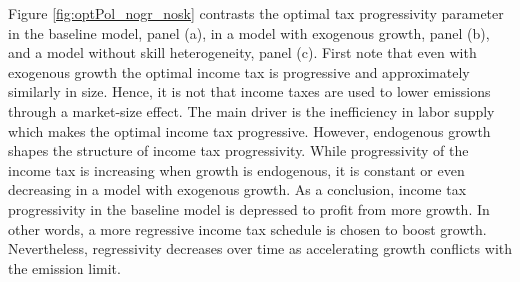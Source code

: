 Figure \ref{fig:optPol_nogr_nosk} contrasts the optimal tax progressivity parameter in the baseline model, panel (a), in a model with exogenous growth, panel (b), and a model without skill heterogeneity, panel (c).
First note that even with exogenous growth the optimal income tax is progressive and approximately similarly in size. Hence, it is not that income taxes are used to lower emissions through a market-size effect. The main driver is the inefficiency in labor supply which makes the optimal income tax progressive. However, endogenous growth shapes the structure of income tax progressivity. 
While progressivity of the income tax is increasing when growth is endogenous, it is constant or even decreasing in a model with exogenous growth. 
As a conclusion, income tax progressivity in the baseline model is depressed to profit from more growth. In other words, a more regressive income tax schedule is chosen to boost growth. Nevertheless, regressivity decreases over time as accelerating growth conflicts with the emission limit.  

